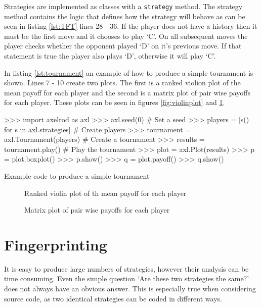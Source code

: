 Strategies are implemented as classes with a \texttt{strategy} method.
The strategy method contains the logic that defines how the strategy will behave as can be seen in listing \ref{lst:TFT} lines 28 - 36.
If the player does not have a history then it must be the first move and it chooses to play `C'.
On all subsequent moves the player checks whether the opponent played `D' on it's previous move.
If that statement is true the player also plays `D', otherwise it will play `C'.

In listing \ref{lst:tournament} an example of how to produce a simple tournament is shown.
Lines 7 - 10 create two plots.
The first is a ranked violion plot of the mean payoff for each player and the second is a matrix plot of pair wise payoffs for each player.
These plots can be seen in figures \ref{fig:violinplot} and \ref{fig:matrixplot}.

\begin{listing}[htbp!]
\begin{ExampleCode}
>>> import axelrod as axl
>>> axl.seed(0)  # Set a seed
>>> players = [s() for s in axl.strategies]  # Create players
>>> tournament = axl.Tournament(players)  # Create a tournament
>>> results = tournament.play()  # Play the tournament
>>> plot = axl.Plot(results)
>>> p = plot.boxplot()
>>> p.show()
>>> q = plot.payoff()
>>> q.show()
\end{ExampleCode}
\caption{Example code to produce a simple tournament}
\label{lst:tournament}
\end{listing}

\begin{figure}
\begin{center}
\caption{Ranked violin plot of th mean payoff for each player}
\label{fig:violinplot}
\end{center}

\begin{center}
\caption{Matrix plot of pair wise payoffs for each player}
\label{fig:matrixplot}
\end{center}
\end{figure}


\section{Fingerprinting}\label{sec:fingerprinting}
It is easy to produce large numbers of strategies, however their analysis can be time consuming.
Even the simple question `Are these two strategies the same?' does not always have an obvious answer.
This is especially true when considering source code, as two identical strategies can be coded in different ways.

